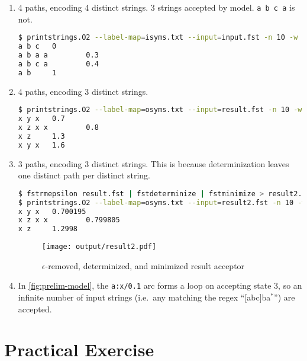 \documentclass[a4paper,oneside,reqno]{amsart}
\begin{document}
\begin{enumerate}[label=(\roman*)]
  \item 4 paths, encoding 4 distinct strings.  3 strings accepted by model.
    \texttt{a b c a} is not.

    \begin{lstlisting}[language=bash]
$ printstrings.O2 --label-map=isyms.txt --input=input.fst -n 10 -w 2> /dev/null
a b c   0
a b a a         0.3
a b c a         0.4
a b     1
    \end{lstlisting}

  \item 4 paths, encoding 3 distinct strings.

    \begin{lstlisting}[language=bash]
$ printstrings.O2 --label-map=osyms.txt --input=result.fst -n 10 -w 2> /dev/null
x y x   0.7
x z x x         0.8
x z     1.3
x y x   1.6
    \end{lstlisting}

  \item 3 paths, encoding 3 distinct strings. This is because determinization leaves
    one distinct path per distinct string.
    \begin{lstlisting}[language=bash]
$ fstrmepsilon result.fst | fstdeterminize | fstminimize > result2.fst
$ printstrings.O2 --label-map=osyms.txt --input=result2.fst -n 10 -w 2> /dev/null
x y x   0.700195
x z x x         0.799805
x z     1.2998
    \end{lstlisting}
    \begin{figure}[ht!]
      \begin{center}
        \texttt{[image: output/result2.pdf]}
      \end{center}
      \caption{$\epsilon$-removed, determinized, and minimized result acceptor}
    \end{figure}

  \item In \autoref{fig:prelim-model}, the \texttt{a:x/0.1} arc forms a
    loop on accepting state $3$, so an infinite number of input strings (i.e.\
    any matching the regex ``[abc]ba$^*$'') are accepted.
\end{enumerate}

\section{Practical Exercise}
\end{document}
